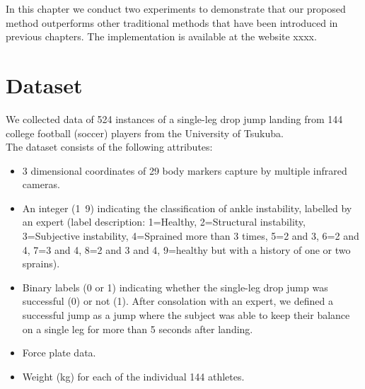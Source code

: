 In this chapter we conduct two experiments to demonstrate that our proposed method outperforms other traditional methods that have been introduced in previous chapters. The implementation is available at the website xxxx. 

\section{Dataset}

We collected data of 524 instances of a single-leg drop jump landing from 144 college football (soccer) players from the University of Tsukuba.
\\

The dataset consists of the following attributes:
\begin{itemize}
  \item 3 dimensional coordinates of 29 body markers capture by multiple infrared cameras. 
  \item An integer (1~9) indicating the classification of ankle instability, labelled by an expert (label description: 1=Healthy, 2=Structural instability, 3=Subjective instability, 4=Sprained more than 3 times, 5=2 and 3, 6=2 and 4, 7=3 and 4, 8=2 and 3 and 4, 9=healthy but with a history of one or two sprains).
  \item Binary labels (0 or 1) indicating whether the single-leg drop jump was successful (0) or not (1). After consolation with an expert, we defined a successful jump as a jump where the subject was able to keep their balance on a single leg for more than 5 seconds after landing.
  \item Force plate data.
  \item Weight (kg) for each of the individual 144 athletes.

\end{itemize}




